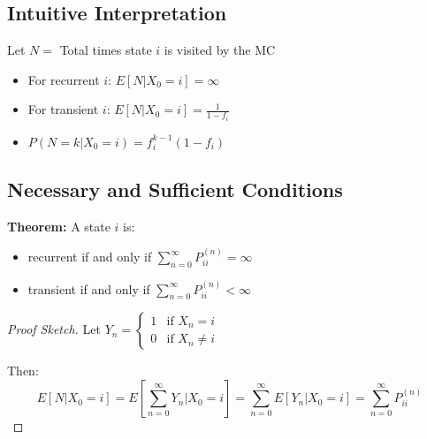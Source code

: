 \documentclass[12pt]{article}
\begin{document}
\subsection*{Intuitive Interpretation}
Let $N =$ Total times state $i$ is visited by the MC
\begin{itemize}
    \item For recurrent $i$: $E[N|X_0 = i] = \infty$
    \begin{center}
    \end{center}
    \item For transient $i$: $E[N|X_0 = i] = \frac{1}{1-f_i}$
    \begin{center}
    \end{center}
    \item $P(N = k|X_0 = i) = f_i^{k-1}(1-f_i)$
\end{itemize}

\subsection*{Necessary and Sufficient Conditions}
\textbf{Theorem: }
A state $i$ is:
\begin{itemize}
    \item recurrent if and only if $\sum_{n=0}^{\infty} P_{ii}^{(n)} = \infty$
    \item transient if and only if $\sum_{n=0}^{\infty} P_{ii}^{(n)} < \infty$
\end{itemize}

\begin{proof}[Proof Sketch]
Let $Y_n = \begin{cases} 1 & \text{if } X_n = i \\ 0 & \text{if } X_n \neq i \end{cases}$

Then:
\[ E[N|X_0 = i] = E[\sum_{n=0}^{\infty} Y_n|X_0 = i] = \sum_{n=0}^{\infty} E[Y_n|X_0 = i] = \sum_{n=0}^{\infty} P_{ii}^{(n)} \]
\end{proof}
\end{document}
